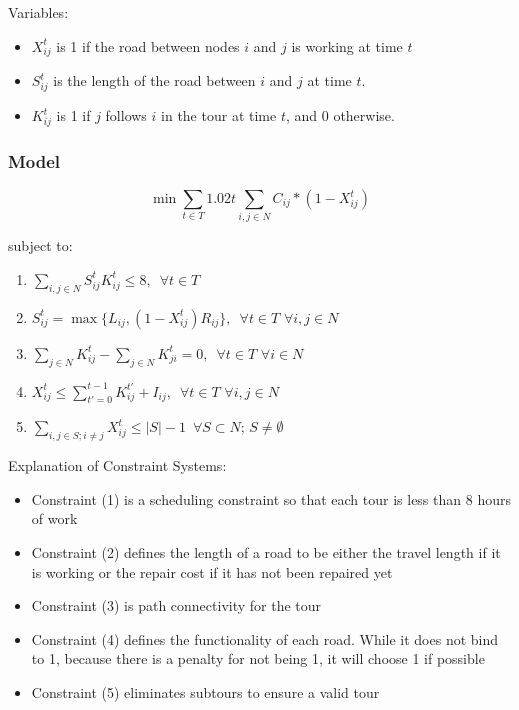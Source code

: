 \documentclass{article}
\begin{document}
Variables:
	\begin{itemize}
		\item $X_{ij}^t$ is 1 if the road between nodes $i$ and $j$ is working at time $t$
		\item $S_{ij}^t$ is the length of the road between $i$ and $j$ at time $t$. 
		\item $K_{ij}^t$ is 1 if $j$ follows $i$ in the tour at time $t$, and 0 otherwise.	
	\end{itemize}
	
	\subsubsection{Model}
	$$	\min \sum_{t \in T} 1.02t \sum_{i,j \in N} C_{ij}*(1-X_{ij}^t) $$
	
	subject to:
	\begin{enumerate}[label=(\arabic*), leftmargin=*, itemsep=0.4ex, before={\everymath{\displaystyle}}]%
		\item $\sum_{i,j \in N} S_{ij}^t K_{ij}^t \leq 8, \hspace{6pt} \forall t\in T$
		\item $S_{ij}^t = \max \{L_{ij}, (1-X_{ij}^t)R_{ij} \}, \hspace{6pt} \forall t\in T \hspace{4pt} \forall i,j \in N$
		\item $\sum_{j \in N} K_{ij}^t - \sum_{j \in N} K_{ji}^t = 0, \hspace{6pt} \forall t\in T \hspace{4pt} \forall i \in N$
		\item $X_{ij}^t \le \sum_{t'=0}^{t-1} K_{ij}^{t'} + I_{ij}, \hspace{6pt} \forall t\in T \hspace{4pt} \forall i,j \in N$
		\item $\sum_{i,j \in S; i\neq j} X_{ij}^t \leq |S|-1 \hspace{6pt} \forall S \subset N; \hspace{2pt} S \neq \emptyset$
	\end{enumerate}
	
Explanation of Constraint Systems:
	\begin{itemize}
		\item Constraint (1) is a scheduling constraint so that each tour is less than 8 hours of work
		\item Constraint (2) defines the length of a road to be either the travel length if it is working or the repair cost if it has not been repaired yet
		\item Constraint (3) is path connectivity for the tour
		\item Constraint (4) defines the functionality of each road. While it does not bind to 1, because there is a penalty for not being 1, it will choose 1 if possible
		\item Constraint (5) eliminates subtours to ensure a valid tour
	\end{itemize}
\end{document}

